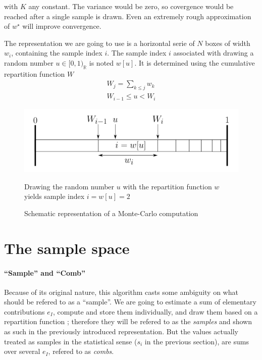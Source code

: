 \documentclass[./thesis.tex]{subfiles}
\begin{document}
with $K$ any constant. The variance would be zero, so covergence would be reached after a single sample is drawn. Even an extremely rough approximation of $w^\star$ will improve convergence.



The representation we are going to use is a horizontal serie of $N$ boxes of width $w_i$, containing the sample index $i$.
The sample index $i$ associated with drawing a random number $u \in [0,1)_\mathbb{R}$ is noted $w[u]$. It is determined using the cumulative repartition function $W$
\begin{align}
W_j = \sum_{k \leq j} w_k \\
W_{i-1} \leq u < W_i
\end{align}

\begin{figure}[h!]
	\begin{center}
		\includegraphics[width=0.9\columnwidth]{figures/pt2/mc_representation}
		\caption{Schematic representation of a Monte-Carlo computation}
		\label{fig:mc_representation}
		Drawing the random number $u$ with the repartition function $w$ yields sample index $i=w[u] = 2$
	\end{center}
\end{figure}





\section{The sample space}

\paragraph{``Sample'' and ``Comb''}
Because of its original nature, this algorithm casts some ambiguity on what should be refered to as a ``sample''. We are going to estimate a sum of elementary contributions $e_I$, compute and store them individually, and draw them based on a repartition function ; therefore they will be refered to as the \emph{samples} and shown as such in the previously introduced representation. But the values actually treated as samples in the statistical sense ($s_i$ in the previous section), are sums over several $e_I$, refered to as \emph{combs}.
\end{document}
